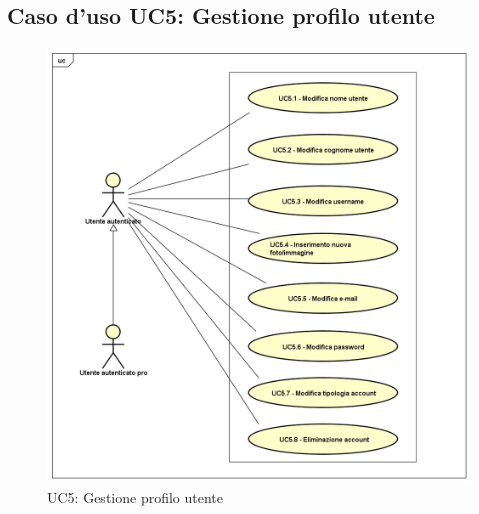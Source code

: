 \subsection{Caso d'uso UC5: Gestione profilo utente}
\label{UC5}
\begin{figure}[h]
	\centering
	\includegraphics[scale=0.5,keepaspectratio]{UML/UC5.png}
	\caption{UC5: Gestione profilo utente}
\end{figure}
\FloatBarrier
